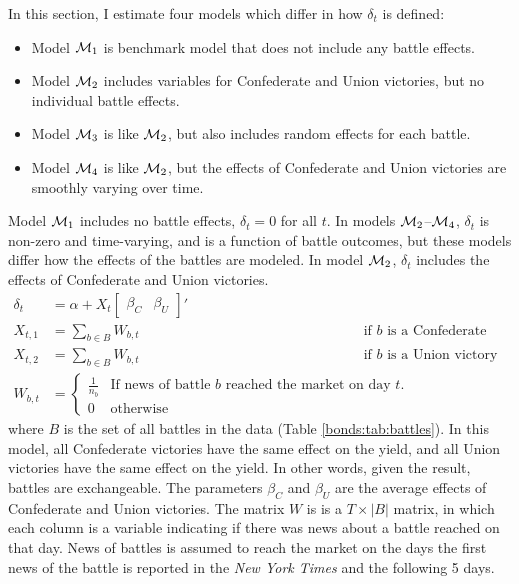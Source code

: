 In this section, I estimate four models which differ in how $\delta_{t}$ is defined:
\begin{itemize}
\item Model $\mathcal{M}_{\text{1}}$ is benchmark model that does not include any battle effects.
\item Model $\mathcal{M}_{\text{2}}$ includes variables for Confederate and Union victories, but no individual battle effects.
\item Model $\mathcal{M}_{\text{3}}$ is like $\mathcal{M}_{\text{2}}$, but also includes random effects for each battle.
\item Model $\mathcal{M}_{\text{4}}$ is like $\mathcal{M}_{\text{2}}$, but the effects of Confederate and Union victories are smoothly varying over time.
\end{itemize}
Model $\mathcal{M}_{\text{1}}$ includes no battle effects, $\delta_{t} = 0$ for all $t$.
In models $\mathcal{M}_{\text{2}}$--$\mathcal{M}_{\text{4}}$, $\delta_{t}$ is non-zero and time-varying, and is a function of battle outcomes, but these models differ how the effects of the battles are modeled.
In model $\mathcal{M}_{\text{2}}$, $\delta_{t}$ includes the effects of Confederate and Union victories.
\begin{align}
  \label{bonds:eq:2}
  \delta_{t} &= \alpha + X_{t} \begin{bmatrix}\beta_{C} & \beta_{U}\end{bmatrix}'  \\
  X_{t, 1} &= \sum_{b \in B} W_{b,t} && \text{if $b$ is a Confederate victory} \\
  X_{t, 2} &= \sum_{b \in B} W_{b,t} && \text{if $b$ is a Union victory} \\
  W_{b,t} &= 
            \begin{cases}
              \frac{1}{n_{b}} & \text{If news of battle $b$ reached the market on day $t$.} \\
              0 & \text{otherwise}
            \end{cases}
\end{align}
where $B$ is the set of all battles in the data (Table \ref{bonds:tab:battles}).
In this model, all Confederate victories have the same effect on the yield, and all Union victories have the same effect on the yield. 
In other words, given the result, battles are exchangeable.
The parameters $\beta_{C}$ and $\beta_{U}$ are the average effects of Confederate and Union victories.
The matrix $W$ is is a $T \times |B|$ matrix, in which each column is a variable indicating if there was news about a battle reached on that day.
News of battles is assumed to reach the market on the days the first news of the battle is reported in the \textit{New York Times} and the following 5 days.
